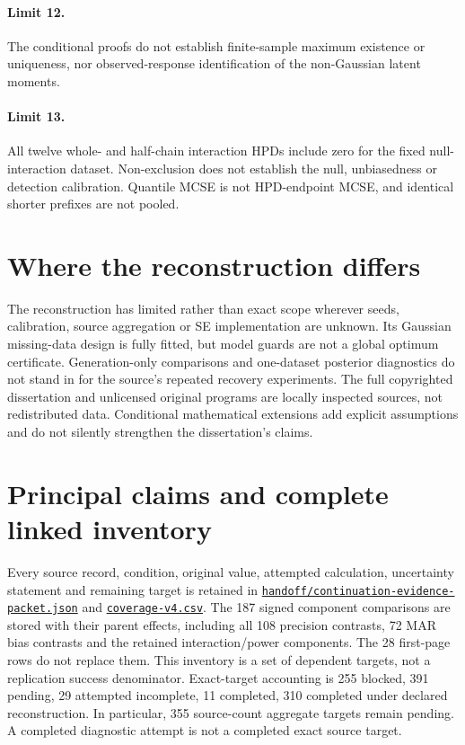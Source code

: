\documentclass[11pt]{article}
\begin{document}
\paragraph{Limit 12.} The conditional proofs do not establish finite-sample maximum existence or uniqueness, nor observed-response identification of the non-Gaussian latent moments.
\paragraph{Limit 13.} All twelve whole- and half-chain interaction HPDs include zero for the fixed null-interaction dataset. Non-exclusion does not establish the null, unbiasedness or detection calibration. Quantile MCSE is not HPD-endpoint MCSE, and identical shorter prefixes are not pooled.
\section{Where the reconstruction differs}
The reconstruction has limited rather than exact scope wherever seeds, calibration, source aggregation or SE implementation are unknown. Its Gaussian missing-data design is fully fitted, but model guards are not a global optimum certificate. Generation-only comparisons and one-dataset posterior diagnostics do not stand in for the source's repeated recovery experiments. The full copyrighted dissertation and unlicensed original programs are locally inspected sources, not redistributed data. Conditional mathematical extensions add explicit assumptions and do not silently strengthen the dissertation's claims.
\appendix
\section{Principal claims and complete linked inventory}
Every source record, condition, original value, attempted calculation, uncertainty statement and remaining target is retained in \href{https://github.com/alectionary/vibe-math/blob/master/formalization/schwabe-psychometric-genetics/handoff/continuation-evidence-packet.json}{\nolinkurl{handoff/continuation-evidence-packet.json}} and \href{https://github.com/alectionary/vibe-math/blob/master/formalization/schwabe-psychometric-genetics/coverage-v4.csv}{\nolinkurl{coverage-v4.csv}}. The 187 signed component comparisons are stored with their parent effects, including all 108 precision contrasts, 72 MAR bias contrasts and the retained interaction/power components. The 28 first-page rows do not replace them. This inventory is a set of dependent targets, not a replication success denominator.
Exact-target accounting is 255 blocked, 391 pending, 29 attempted incomplete, 11 completed, 310 completed under declared reconstruction. In particular, 355 source-count aggregate targets remain pending. A completed diagnostic attempt is not a completed exact source target.
\end{document}
